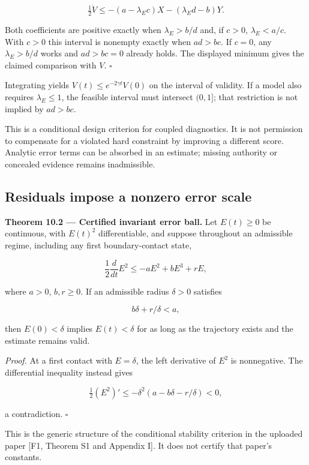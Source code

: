\documentclass[11pt,a4paper]{article}
\begin{document}
\[\tfrac12\dot V\leq-(a-\lambda_Ec)X-(\lambda_Ed-b)Y.\]

Both coefficients are positive exactly when \(\lambda_E>b/d\) and, if
\(c>0\), \(\lambda_E<a/c\). With \(c>0\) this interval is nonempty
exactly when \(ad>bc\). If \(c=0\), any \(\lambda_E>b/d\) works and
\(ad>bc=0\) already holds. The displayed minimum gives the claimed
comparison with \(V\). \(\square\)

Integrating yields \(V(t)\leq e^{-2\gamma t}V(0)\) on the interval of
validity. If a model also requires \(\lambda_E\leq1\), the feasible
interval must intersect \((0,1]\); that restriction is not implied by
\(ad>bc\).

This is a conditional design criterion for coupled diagnostics. It is
not permission to compensate for a violated hard constraint by improving
a different score. Analytic error terms can be absorbed in an estimate;
missing authority or concealed evidence remains inadmissible.

\subsection{Residuals impose a nonzero error
scale}\label{residuals-impose-a-nonzero-error-scale}


\textbf{Theorem 10.2 --- Certified invariant error ball.} Let
\(E(t)\geq0\) be continuous, with \(E(t)^2\) differentiable, and suppose
throughout an admissible regime, including any first boundary-contact
state,

\nopagebreak[4]

\[\frac12\frac{d}{dt}E^2\leq-aE^2+bE^3+rE,\]

where \(a>0\), \(b,r\geq0\). If an admissible radius \(\delta>0\)
satisfies

\nopagebreak[4]

\[\boxed{b\delta+r/\delta<a,}\]

then \(E(0)<\delta\) implies \(E(t)<\delta\) for as long as the
trajectory exists and the estimate remains valid.

\emph{Proof.} At a first contact with \(E=\delta\), the left derivative
of \(E^2\) is nonnegative. The differential inequality instead gives

\nopagebreak[4]

\[\tfrac12(E^2)'\leq-\delta^2(a-b\delta-r/\delta)<0,\]

a contradiction. \(\square\)

This is the generic structure of the conditional stability criterion in
the uploaded paper {[}F1, Theorem S1 and Appendix I{]}. It does not
certify that paper's constants.
\end{document}
